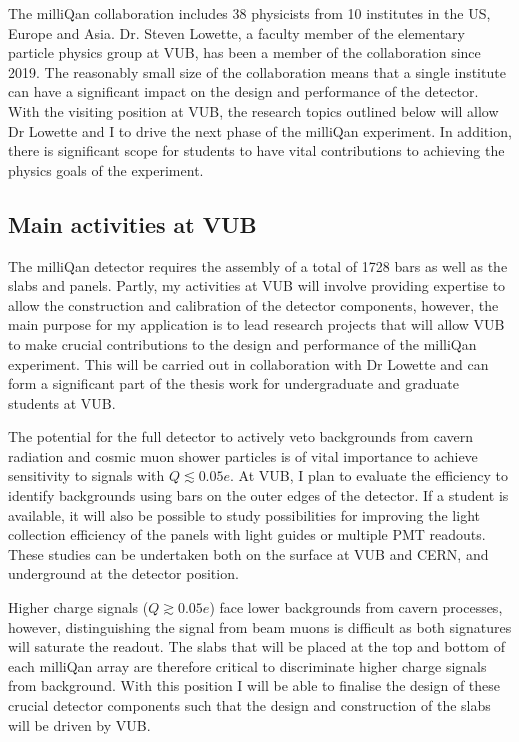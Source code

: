 \documentclass[11pt]{article}
\theoremstyle{plain} \numberwithin{equation}{section}
\theoremstyle{definition}
\begin{document}
The milliQan collaboration includes 38 physicists from 10 institutes in the US, 
Europe and Asia. Dr. Steven Lowette, a faculty member of the elementary particle 
physics group at VUB, has been a member of the collaboration since
2019. The reasonably small size of the collaboration means that a single institute
can have a significant impact on the design and performance of the detector. 
With the visiting position at VUB, the research topics outlined below
will allow Dr Lowette and I to drive 
the next phase of the milliQan experiment. In addition,
there is significant scope for students to have vital contributions to 
achieving the physics goals of the experiment.  

\subsection*{Main activities at VUB}

The milliQan detector requires the assembly of a total of 1728 bars as well
as the slabs and panels. Partly, my activities at VUB will involve 
providing expertise to allow the construction and calibration of the detector components, 
however, the main purpose for my application is
to lead research projects that will allow VUB to make crucial contributions to
the design and performance of the milliQan experiment. 
This will be carried out in collaboration with Dr Lowette and
can form a significant part of the thesis work for undergraduate and graduate
students at VUB.

The potential for the full detector to actively veto backgrounds from cavern radiation
and cosmic muon shower particles is of vital importance to 
achieve sensitivity to signals with $Q \lesssim 0.05 e$. At VUB, I plan to 
evaluate the efficiency to identify backgrounds using 
bars on the outer edges of the detector. If a student is available, it will also
be possible to study possibilities for improving the light collection efficiency of the panels 
with light guides or multiple PMT readouts. These studies can be undertaken 
both on the surface at VUB and CERN, and underground at the detector position.

Higher charge signals ($Q \gtrsim 0.05 e$) face lower backgrounds from cavern processes,
however, distinguishing the signal from beam muons is difficult as both 
signatures will saturate the readout. The slabs that will be placed at the top and bottom 
of each milliQan array are therefore critical to discriminate higher charge signals from background.
With this position I will be able to finalise the design of these crucial detector components such that the 
design and construction of the slabs will be driven by VUB.
\end{document}
